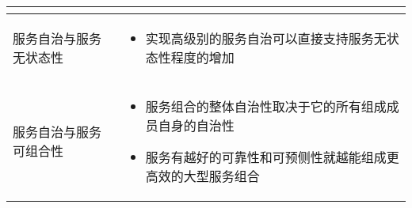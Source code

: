 \begin{longtable}{|m{3cm}<{\centering}|m{12cm}|}
\begin{itemize}[leftmargin=1.5em,itemsep=-3pt,topsep=-3pt]
    \end{itemize}  
    \\ \hline
    服务自治与服务无状态性
    & 
    \vspace{-1.3em}
    \begin{itemize}[leftmargin=1.5em,itemsep=-3pt,topsep=-3pt]
        \item 实现高级别的服务自治可以直接支持服务无状态性程度的增加
    \vspace{-1.5em}
    \end{itemize}  
    \\ \hline
    服务自治与服务可组合性
    & 
    \vspace{-1.3em}
    \begin{itemize}[leftmargin=1.5em,itemsep=-3pt,topsep=-3pt]
        \item 服务组合的整体自治性取决于它的所有组成成员自身的自治性
        \item 服务有越好的可靠性和可预侧性就越能组成更高效的大型服务组合 
    \vspace{-1.5em}
    \end{itemize}  
    \\ \hline
\end{longtable}